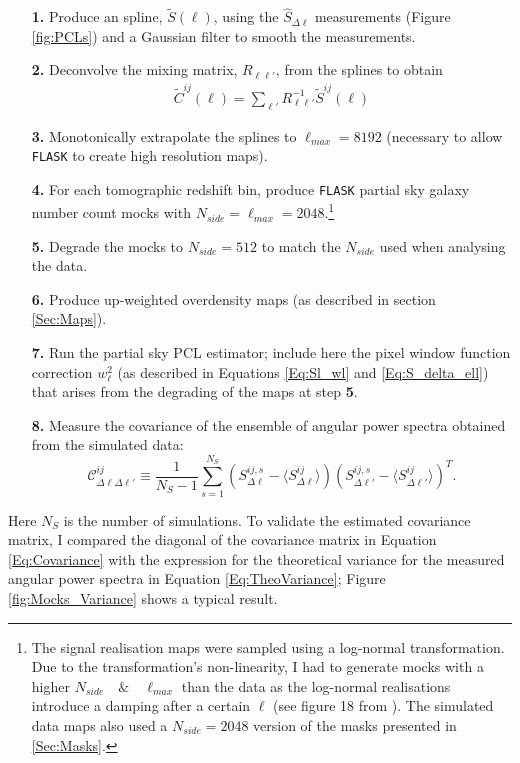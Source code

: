\begin{enumerate}
\item[\textbf{1.}] Produce an spline, $\tilde{S}(\ell)$, using the $\hat{S}_{\Delta\ell}$ measurements (Figure \ref{fig:PCLs}) and a Gaussian filter to smooth the measurements.
\item[\textbf{2.}] Deconvolve the mixing matrix, $R_{\ell\ell'}$, from the splines to obtain
\begin{align}
\tilde{C}^{ij}(\ell) = \sum_{\ell'}R_{\ell\ell'}^{-1}\tilde{S}^{ij}(\ell)
\end{align}
\item[\textbf{3.}] Monotonically extrapolate the splines to $\ell_{max} = 8192$ (necessary to allow \texttt{FLASK} to create high resolution \healpix maps).
\item[\textbf{4.}] For each tomographic redshift bin, produce \texttt{FLASK} partial sky galaxy number count mocks with $N_{side} = \ell_{max} = 2048$.\footnote{The signal realisation maps were sampled using a log-normal transformation. Due to the transformation's non-linearity, I had to generate mocks with a higher $N_{side} \quad \& \quad\ell_{max}$ than the data as the log-normal realisations introduce a damping after a certain $\ell$ (see figure 18 from \cite{Flask2016}). The simulated data maps also used a $N_{side}=2048$ version of the masks presented in \ref{Sec:Masks}.}
\item[\textbf{5.}] Degrade the mocks to $N_{side}=512$ to match the $N_{side}$ used when analysing the data.
\item[\textbf{6.}] Produce up-weighted overdensity maps (as described in section \ref{Sec:Maps}).
\item[\textbf{7.}]Run the partial sky PCL estimator; include here the pixel window function correction $w_{\ell}^2$ (as described in Equations \eqref{Eq:Sl_wl} and \eqref{Eq:S_delta_ell}) that arises from the degrading of the maps at step \textbf{5}.
\item[\textbf{8.}] Measure the covariance of the ensemble of angular power spectra obtained from the simulated data:
\begin{equation}
\mathcal{C}^{ij}_{\Delta\ell\Delta\ell'} \equiv \frac{1}{N_S-1}\sum^{N_S}_{s=1}\left(S_{\Delta\ell}^{ij,s} - \langle S_{\Delta\ell}^{ij} \rangle \right)\left(S_{\Delta\ell'}^{ij,s} - \langle S_{\Delta\ell'}^{ij} \rangle \right)^T.
\label{Eq:Covariance}
\end{equation}
\end{enumerate}
Here $N_S$ is the number of simulations.
To validate the estimated covariance matrix, I compared the diagonal of the covariance matrix in Equation \eqref{Eq:Covariance} with the expression for the theoretical variance for the measured angular power spectra in Equation \eqref{Eq:TheoVariance}; Figure \ref{fig:Mocks_Variance} shows a typical result.


